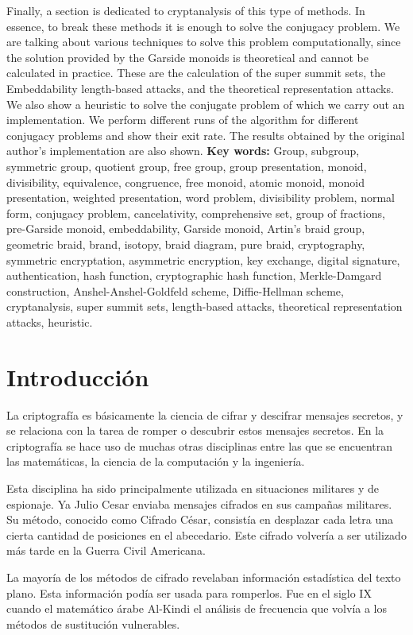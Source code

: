 \documentclass[12pt]{book}
\theoremstyle{definition}
\begin{document}
Finally, a section is dedicated to cryptanalysis of this type of methods. In essence, to break these methods it is enough to solve the conjugacy problem. We are talking about various techniques to solve this problem computationally, since the solution provided by the Garside monoids is theoretical and cannot be calculated in practice. These are the calculation of the super summit sets, the Embeddability length-based attacks, and the theoretical representation attacks. We also show a heuristic to solve the conjugate problem of which we carry out an implementation. We perform different runs of the algorithm for different conjugacy problems and show their exit rate. The results obtained by the original author's implementation are also shown.
\newline
\newline
\textbf{Key words:} Group, subgroup, symmetric group, quotient group, free group, group presentation, monoid, divisibility, equivalence, congruence, free monoid, atomic monoid, monoid presentation,  weighted presentation, word problem, divisibility problem, normal form, conjugacy problem, cancelativity, comprehensive set, group of fractions, pre-Garside monoid, embeddability, Garside monoid, Artin’s braid group, geometric braid, brand, isotopy, braid diagram, pure braid, cryptography, symmetric encryptation, asymmetric encryption, key exchange, digital signature, authentication, hash function, cryptographic hash function, Merkle-Damgard construction, Anshel-Anshel-Goldfeld scheme, Diffie-Hellman scheme, cryptanalysis, super summit sets, length-based attacks, theoretical representation attacks, heuristic.
\chapter{Introducción}
La criptografía es básicamente la ciencia de cifrar y descifrar mensajes secretos, y se relaciona con la tarea de romper o descubrir estos mensajes secretos. En la criptografía se hace uso de muchas otras disciplinas entre las que se encuentran las matemáticas, la ciencia de la computación y la ingeniería.

Esta disciplina ha sido principalmente utilizada en situaciones militares y de espionaje. Ya Julio Cesar enviaba mensajes cifrados en sus campañas militares. Su método, conocido como Cifrado César, consistía en desplazar cada letra una cierta cantidad de posiciones en el abecedario. Este cifrado volvería a ser utilizado más tarde en la Guerra Civil Americana.

La mayoría de los métodos de cifrado revelaban información estadística del texto plano. Esta información podía ser usada para romperlos. Fue en el siglo IX cuando el matemático árabe Al-Kindi el análisis de frecuencia que volvía a los métodos de sustitución vulnerables.
\end{document}
